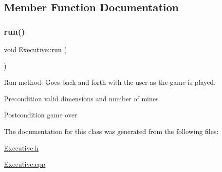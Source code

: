 \subsection{Member Function Documentation}
\mbox{\label{class_executive_adef7cad3387e8fc79d92ffd418f45258}} 
\subsubsection{\texorpdfstring{run()}{run()}}
{\footnotesize\ttfamily void Executive\+::run (\begin{DoxyParamCaption}{ }\end{DoxyParamCaption})}



Run method. Goes back and forth with the user as the game is played. 

\begin{DoxyPrecond}{Precondition}
valid dimensions and number of mines 
\end{DoxyPrecond}
\begin{DoxyPostcond}{Postcondition}
game over 
\end{DoxyPostcond}


The documentation for this class was generated from the following files\+:\begin{DoxyCompactItemize}
\item 
\mbox{\hyperlink{_executive_8h}{Executive.\+h}}\item 
\mbox{\hyperlink{_executive_8cpp}{Executive.\+cpp}}\end{DoxyCompactItemize}
